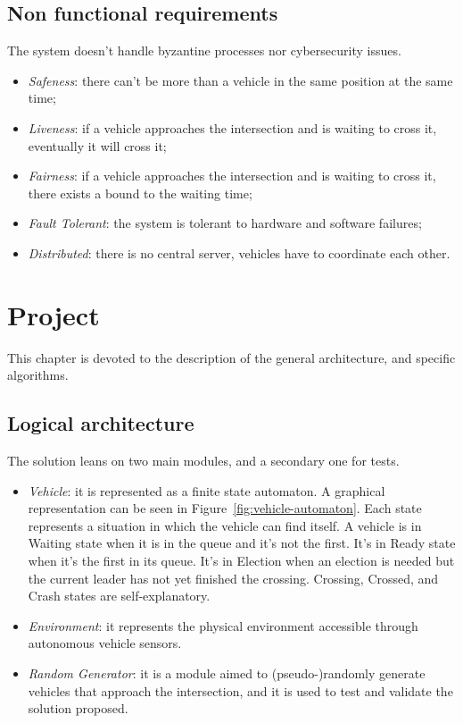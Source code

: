 \documentclass{memoir}
\begin{document}
\section{Non functional requirements}
The system doesn't handle byzantine processes nor cybersecurity issues.

\begin{itemize}
	\item \emph{Safeness}: there can't be more than a vehicle in the same position at the same time;
	\item \emph{Liveness}: if a vehicle approaches the intersection and is waiting to cross it, eventually it will cross it;
	\item \emph{Fairness}: if a vehicle approaches the intersection and is waiting to cross it, there exists a bound to the waiting time;
	\item \emph{Fault Tolerant}: the system is tolerant to hardware and software failures;
	\item \emph{Distributed}: there is no central server, vehicles have to coordinate each other.
\end{itemize}



\chapter{Project}\label{ch:project}
This chapter is devoted to the description of the general architecture, and specific algorithms.

\section{Logical architecture}
The solution leans on two main modules, and a secondary one for tests.

\begin{itemize}
	\item \emph{Vehicle}: it is represented as a finite state automaton. A graphical representation can be seen in Figure~\ref{fig:vehicle-automaton}. Each state represents a situation in which the vehicle can find itself. A vehicle is in Waiting state when it is in the queue and it's not the first. It's in Ready state when it's the first in its queue. It's in Election when an election is needed but the current leader has not yet finished the crossing. Crossing, Crossed, and Crash states are self-explanatory.
	\item \emph{Environment}: it represents the physical environment accessible through autonomous vehicle sensors.
	\item \emph{Random Generator}: it is a module aimed to (pseudo-)randomly generate vehicles that approach the intersection, and it is used to test and validate the solution proposed.
\end{itemize}
\end{document}
